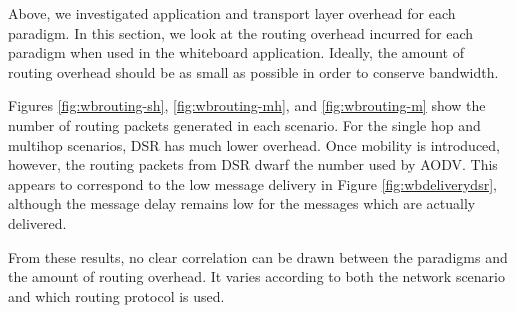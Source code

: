 Above, we investigated application and transport layer overhead for each paradigm. In this section, we look at the routing overhead incurred for each paradigm when used in the whiteboard application. Ideally, the amount of routing overhead should be as small as possible in order to conserve bandwidth.

Figures \ref{fig:wbrouting-sh}, \ref{fig:wbrouting-mh}, and \ref{fig:wbrouting-m} show the number of routing packets generated in each scenario. For the single hop and multihop scenarios, DSR has much lower overhead. Once mobility is introduced, however, the routing packets from DSR dwarf the number used by AODV. This appears to correspond to the low message delivery in Figure \ref{fig:wbdeliverydsr}, although the message delay remains low for the messages which are actually delivered.

From these results, no clear correlation can be drawn between the paradigms and the amount of routing overhead. It varies according to both the network scenario and which routing protocol is used.
